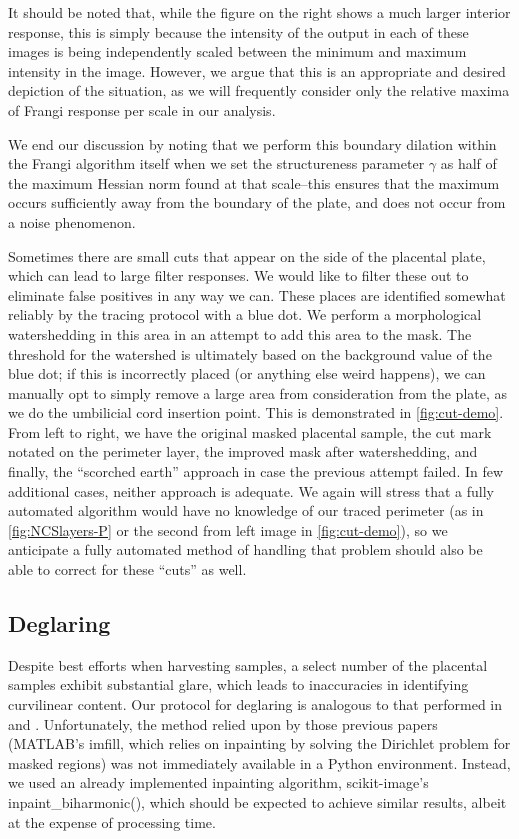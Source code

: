     It should be noted that, while the figure on the right shows a much larger interior response, this is simply because the intensity of the output in each of these
    images is being independently scaled between the minimum and maximum intensity in the image. However, we argue that this is an appropriate and desired depiction of the situation, as we will frequently consider only the relative maxima of Frangi response per scale in our analysis.
    
    We end our discussion by noting that we perform this boundary dilation within the
    Frangi algorithm itself when we set the structureness parameter $\gamma$ as half of the maximum Hessian norm found at that scale--this ensures that the maximum occurs sufficiently away from the boundary of the plate, and does not occur from a noise phenomenon.

    
    
    Sometimes there are small cuts that appear on the side of the placental plate, which can lead to large filter responses. We would like to filter these out to eliminate false positives in any way we can. These places are identified somewhat reliably by the tracing protocol with a blue dot. We perform a morphological watershedding in this area in an attempt to add this area to the mask.
    The threshold for the watershed is ultimately based on the background value of the blue dot; if this is incorrectly placed (or anything else weird happens), we can manually opt to simply remove a large area from consideration from the plate, as we do the umbilicial cord insertion point. This is demonstrated in \cref{fig:cut-demo}. From left to right, we have the original masked placental sample, the cut mark notated on the perimeter layer, the improved mask after watershedding, and finally, the ``scorched earth'' approach in case the previous attempt failed. In few additional cases, neither approach is adequate. We again will stress that a fully automated algorithm would have no knowledge of our traced perimeter (as in \cref{fig:NCSlayers-P} or the second from left image in \cref{fig:cut-demo}), so we anticipate a fully automated method of handling that problem should also be able to correct for these ``cuts'' as well.

		
		    \subsection{Deglaring}
    
    Despite best efforts when harvesting samples, a select number of the placental samples exhibit substantial glare, which leads to inaccuracies in identifying curvilinear content. Our protocol for deglaring is analogous to that performed in \autocite{almoussa-ucla-reu} and \autocite{huynh2013filter}. Unfortunately, the method relied upon by those previous papers (\textrm{MATLAB}'s \textrm{imfill}, which relies on inpainting by solving the Dirichlet problem for masked regions) was not immediately available in a Python environment. Instead, we used an already implemented inpainting algorithm, \textrm{scikit-image}'s \textrm{inpaint\_biharmonic()}, which should be expected to achieve similar results, albeit at the expense of processing time.
    
